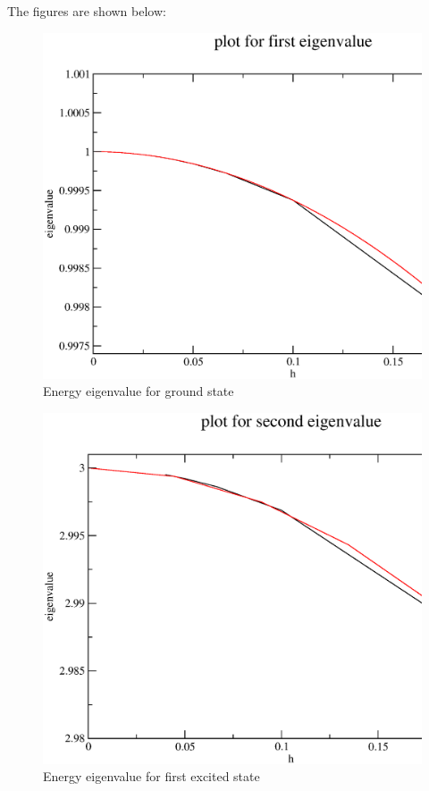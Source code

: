 \documentclass[11pt,a4paper,english]{article}
\begin{document}
    
    The figures are shown below:\\
	\begin{figure}[h!]
	\centering
	\includegraphics [scale=0.6]{e0.eps}
	\caption{Energy eigenvalue for ground state }
	\end{figure}
	\clearpage
	
	\begin{figure}[h!]
	\centering
	\includegraphics [scale=0.6]{e1.eps}
	\caption{Energy eigenvalue for first excited state }
	\end{figure}
	\clearpage
	
\end{document}
